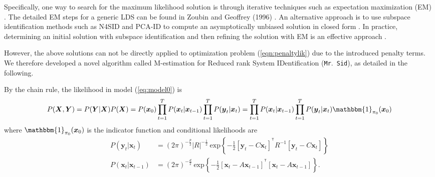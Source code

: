 \documentclass[fleqn]{article}
\let\oldref\ref
\renewcommand{\ref}[1]{(\oldref{#1})}
\newcommand{\T}{^{\ensuremath{\mathsf{T}}}}           %
\newcommand{\mrsid}{{\sc \texttt{Mr}.~\texttt{Sid}}}
\providecommand{\mb}[1]{\boldsymbol{#1}}
\newcommand{\bx}{\mb{x}}
\newcommand{\by}{\mb{y}}
\newcommand{\bX}{\mb{X}}
\newcommand{\bY}{\mb{Y}}
\begin{document}
Specifically, one way to search for the maximum likelihood solution is through iterative techniques such as expectation maximization (EM) \cite{shumway1982approach}. The detailed EM steps for a generic LDS can be found in Zoubin and Geoffrey (1996) \cite{ghahramani1996parameter}. An alternative approach is to use subspace identification methods such as N4SID and PCA-ID to compute an asymptotically unbiased solution in closed form \cite{van1994n4sid,doretto2003dynamic}. In practice, determining an initial solution with subspace identification and then refining the solution with EM is an effective approach \cite{bootslearning}.

However, the above solutions can not be directly applied to optimization problem \ref{eqn:penaltylik} due to the introduced penalty terms. We therefore developed a novel algorithm called M-estimation for Reduced rank System IDentification (\mrsid), as detailed in the following.

By the chain rule, the likelihood in model \ref{eq:model0} is
\begin{equation*}\label{eqn:likelihood}
P(\bX,\bY)=P(\bY|\bX) P(\bX)= P(\bx_0)\prod\limits_{t=1}^{T}P(\bx_t|\bx_{t-1})\prod\limits_{t=1}^{T} P(\by_t|\bx_t)=\prod\limits_{t=1}^{T}P(\bx_t|\bx_{t-1})\prod\limits_{t=1}^{T} P(\by_t|\bx_t)\mathbbm{1}_{\mathbf{\pi}_0}(\bx_0)
\end{equation*}
where $\mathbbm{1}_{\mathbf{\pi}_0}(\bx_0)$ is the indicator function and conditional likelihoods are
\begin{equation*}\label{eqn:condlik}
\begin{aligned}
P(\by_t|\bx_t)&= (2\pi)^{-\frac{p}{2}}|R|^{-\frac{1}{2}}\  \text{exp}\left\{-\frac{1}{2}[\by_t-C\bx_t]^{\T}R^{-1}[\by_t-C\bx_t]\right\}\\
P(\bx_t|\bx_{t-1})
&=(2\pi)^{-\frac{d}{2}}\  \text{exp}\left\{-\frac{1}{2}[\bx_t-A\bx_{t-1}]^{\T}[\bx_t-A\bx_{t-1}]\right\}.
\end{aligned}
\end{equation*}
\end{document}
